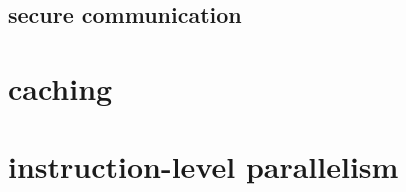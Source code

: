 

\subsection{secure communication}

\section{caching}




\section{instruction-level parallelism}



